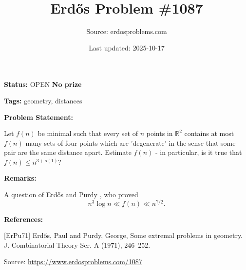 \documentclass{article}
\title{Erd\H{o}s Problem \#1087}
\date{Last updated: 2025-10-17}
\author{Source: erdosproblems.com}
\begin{document}
\maketitle

\noindent\textbf{Status:} OPEN \quad \textbf{No prize}

\noindent\textbf{Tags:} geometry, distances

\medskip
\noindent\textbf{Problem Statement:}

Let $f(n)$ be minimal such that every set of $n$ points in $\mathbb{R}^2$ contains at most $f(n)$ many sets of four points which are 'degenerate' in the sense that some pair are the same distance apart. Estimate $f(n)$ - in particular, is it true that $f(n)\leq n^{3+o(1)}$?

\bigskip
\noindent\textbf{Remarks:}

A question of Erd\H{o}s and Purdy \cite{ErPu71}, who proved\[n^3\log n \ll f(n) \ll n^{7/2}.\]

\bigskip
\noindent\textbf{References:}

[ErPu71] Erd\H{o}s, Paul and Purdy, George, Some extremal problems in geometry. J. Combinatorial Theory Ser. A (1971), 246--252.

\bigskip
\noindent\small{Source: \url{https://www.erdosproblems.com/1087}}
\end{document}
